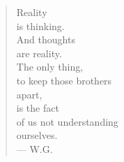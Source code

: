\begin{quote}
Reality \\
is thinking. \\
And thoughts \\
are reality. \\
The only thing, \\
to keep those brothers \\
apart, \\
is the fact \\
of us not understanding \\
ourselves. \\
--- W.G.
\end{quote}

